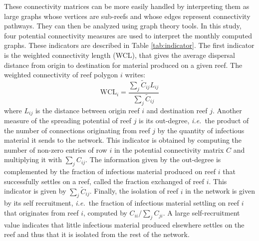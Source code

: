 \documentclass[utf8]{frontiersSCNS}
\newcommand{\ie}{{\it i.e.}\ }
\begin{document}
These connectivity matrices can be more easily handled by interpreting them as large graphs whose vertices are sub-reefs and whose edges represent connectivity pathways. They can then be analyzed using graph theory tools. In this study, four potential connectivity measures are used to interpret the monthly computed graphs. These indicators are described in Table \ref{tab:indicator}. The first indicator is the weighted connectivity length (WCL), that gives the average dispersal distance from origin to destination for material produced on a given reef. The weighted connectivity of reef polygon $i$ writes:
\begin{equation}
    \textrm{WCL}_i = \dfrac{\sum_j \tilde{C}_{ij} L_{ij}}{\sum_j \tilde{C}_{ij}}
\end{equation}
where $L_{ij}$ is the distance between origin reef $i$ and destination reef $j$. Another measure of the spreading potential of reef $j$ is its out-degree, \ie the product of the number of connections originating from reef $j$ by the quantity of infectious material it sends to the network. This indicator is obtained by computing the number of non-zero entries of row $i$ in the potential connectivity matrix $C$ and multiplying it with $\sum_j C_{ij}$. The information given by the out-degree is complemented by the fraction of infectious material produced on reef $i$ that successfully settles on a reef, called the fraction exchanged of reef $i$. This indicator is given by $\sum_{j} \tilde{C}_{ij}$. Finally, the isolation of reef $i$ in the network is given by its self recruitment, \ie the fraction of infectious material settling on reef $i$ that originates from reef $i$, computed by $C_{ii}/\sum_jC_{ji}$. A large self-recruitment value indicates that little infectious material produced elsewhere settles on the reef and thus that it is isolated from the rest of the network. 
\end{document}
